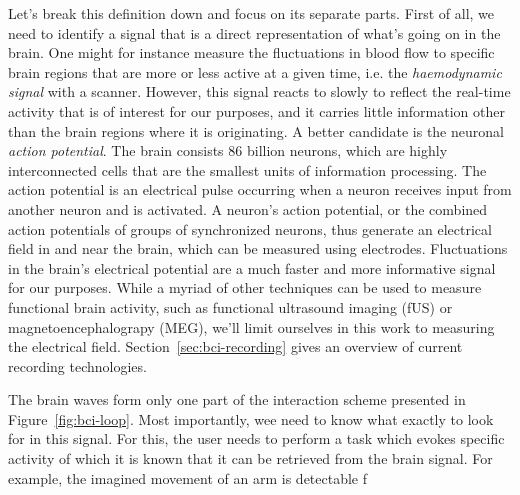 Let's break this definition down and focus on its separate parts.
First of all, we need to identify a signal that is a direct representation of
what's going on in the brain.
One might for instance measure the fluctuations in blood flow to specific brain
regions that are more or less active at a given time, i.e. the
\textit{haemodynamic signal} with a scanner.
However, this signal reacts to slowly to reflect the real-time activity that is
of interest for our purposes, and it carries little information other than the
brain regions where it is originating.
A better candidate is the neuronal \textit{action potential}.
The brain consists 86 billion neurons, which are highly interconnected cells that are
the smallest units of information processing.
The action potential is an electrical pulse occurring when a neuron receives
input from another neuron and is activated.
A neuron's action potential, or the combined action potentials of groups of
synchronized neurons, thus generate an electrical field in and near the brain,
which can be measured using electrodes.
Fluctuations in the brain's electrical potential are a much faster and more
informative signal for our purposes.
While a myriad of other techniques can be used to measure functional brain
activity, such as functional ultrasound imaging (fUS) or magnetoencephalograpy
(MEG), we'll limit ourselves in this work to measuring the electrical field.
Section~\ref{sec:bci-recording} gives an overview of current recording
technologies.

The brain waves form only one part of the interaction scheme presented
in Figure~\ref{fig:bci-loop}.
Most importantly, wee need to know what exactly to look for in this signal.
For this, the user needs to perform a task which evokes specific activity of
which it is known that it can be retrieved from the brain signal.
For example, the imagined movement of an arm is detectable f

